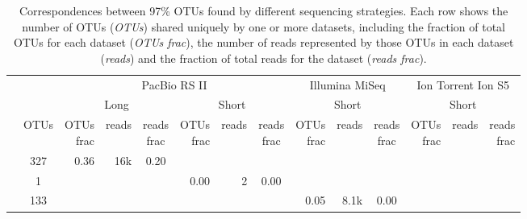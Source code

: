 \documentclass[
]{article}
\begin{document}
\begin{table}

\caption[Correspondences between 97\% OTUs found by different sequencing strategies]{\label{tab:venn-table-otu}Correspondences between 97\% OTUs found by different sequencing strategies. Each row shows the number of OTUs (\emph{OTUs}) shared uniquely by one or more datasets, including the fraction of total OTUs for each dataset (\emph{OTUs frac}), the number of reads represented by those OTUs in each dataset (\emph{reads}) and the fraction of total reads for the dataset (\emph{reads frac}).}
\centering
\begin{tabular}[t]{rcrrcrrcrrcrrr}
\toprule
\multicolumn{2}{c}{ } & \multicolumn{6}{c}{PacBio RS II} & \multicolumn{3}{c}{Illumina MiSeq} & \multicolumn{3}{c}{Ion Torrent Ion S5} \\
\cmidrule(l{3pt}r{3pt}){3-8} \cmidrule(l{3pt}r{3pt}){9-11} \cmidrule(l{3pt}r{3pt}){12-14}
\multicolumn{2}{c}{ } & \multicolumn{3}{c}{Long} & \multicolumn{3}{c}{Short} & \multicolumn{3}{c}{Short} & \multicolumn{3}{c}{Short} \\
\cmidrule(l{3pt}r{3pt}){3-5} \cmidrule(l{3pt}r{3pt}){6-8} \cmidrule(l{3pt}r{3pt}){9-11} \cmidrule(l{3pt}r{3pt}){12-14}
\makecell[c]{\\} & OTUs & \makecell[c]{OTUs\\frac} & reads & \makecell[c]{reads\\frac} & \makecell[c]{OTUs\\frac} & reads & \makecell[c]{reads\\frac} & \makecell[c]{OTUs\\frac} & reads & \makecell[c]{reads\\frac} & \makecell[c]{OTUs\\frac} & reads & \makecell[c]{reads\\frac}\\
\midrule
 & 327 & 0.36 & 16k & 0.20 & \cellcolor{gray}{  } & \cellcolor{gray}{  } & \cellcolor{gray}{  } & \cellcolor{gray}{  } & \cellcolor{gray}{  } & \cellcolor{gray}{  } & \cellcolor{gray}{  } & \cellcolor{gray}{  } & \cellcolor{gray}{  }\\
 & 1 & \cellcolor{gray}{  } & \cellcolor{gray}{  } & \cellcolor{gray}{  } & 0.00 & 2 & 0.00 & \cellcolor{gray}{  } & \cellcolor{gray}{  } & \cellcolor{gray}{  } & \cellcolor{gray}{  } & \cellcolor{gray}{  } & \cellcolor{gray}{  }\\
 & 133 & \cellcolor{gray}{  } & \cellcolor{gray}{  } & \cellcolor{gray}{  } & \cellcolor{gray}{  } & \cellcolor{gray}{  } & \cellcolor{gray}{  } & 0.05 & 8.1k & 0.00 & \cellcolor{gray}{  } & \cellcolor{gray}{  } & \cellcolor{gray}{  }\\

\end{tabular}
\end{table}
\end{document}
